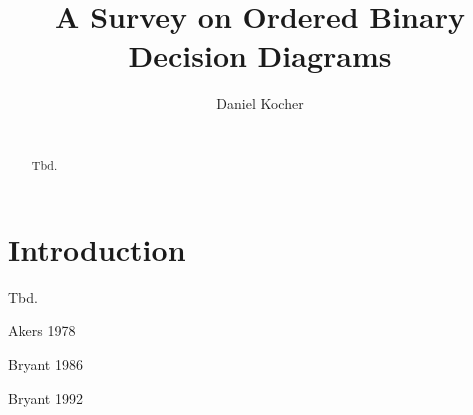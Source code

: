 \documentclass{vldb}
\begin{document}
\title{A Survey on Ordered Binary Decision Diagrams}


\author{
\alignauthor
	Daniel Kocher\\
    \\
}

\maketitle

\begin{abstract}
Tbd.
\end{abstract}

\section{Introduction}   
Tbd. \newline

\noindent Akers 1978\cite{Akers:1978} \newline

Bryant 1986\cite{Bryant:1986} \newline

\noindent Bryant 1992\cite{Bryant:1992} \newline


\balance



\end{document}
